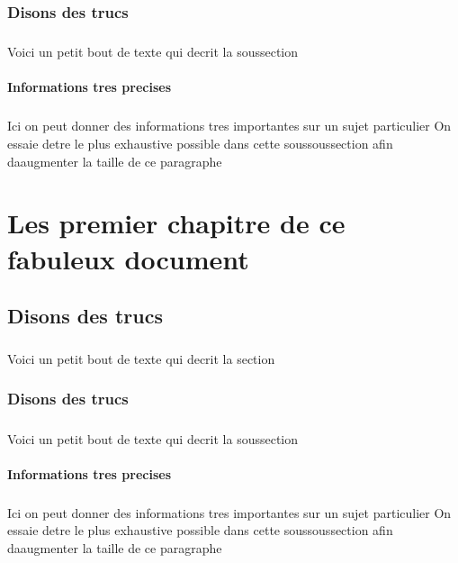 \documentclass[a4paper,10pt,openany,oneside]{report}
\begin{document}
\subsection{Disons des trucs}
\paragraph{}
Voici un petit bout de texte qui decrit la soussection

\subsubsection{Informations tres precises}
\paragraph{}
Ici on peut donner des informations tres importantes sur un sujet particulier On essaie detre le plus exhaustive possible dans cette soussoussection afin daaugmenter la taille de ce paragraphe

\chapter{Les premier chapitre de ce fabuleux document}

\section{Disons des trucs}
\paragraph{}
Voici un petit bout de texte qui decrit la section

\subsection{Disons des trucs}
\paragraph{}
Voici un petit bout de texte qui decrit la soussection

\subsubsection{Informations tres precises}
\paragraph{}
Ici on peut donner des informations tres importantes sur un sujet particulier On essaie detre le plus exhaustive possible dans cette soussoussection afin daaugmenter la taille de ce paragraphe
\end{document}
